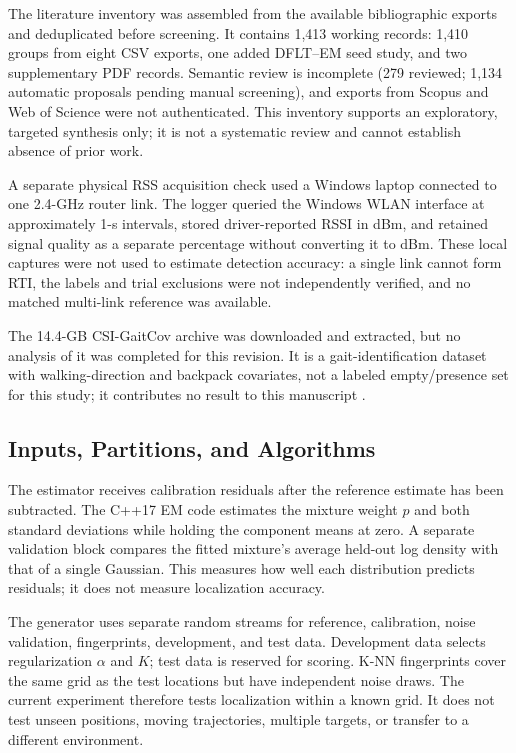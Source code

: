 \documentclass[sensors,article,submit,oneauthor]{Definitions/mdpi}
\begin{document}
The literature inventory was assembled from the available bibliographic exports and deduplicated before screening. It contains 1,413 working records: 1,410 groups from eight CSV exports, one added DFLT--EM seed study, and two supplementary PDF records. Semantic review is incomplete (279 reviewed; 1,134 automatic proposals pending manual screening), and exports from Scopus and Web of Science were not authenticated. This inventory supports an exploratory, targeted synthesis only; it is not a systematic review and cannot establish absence of prior work.

A separate physical RSS acquisition check used a Windows laptop connected to one 2.4-GHz router link. The logger queried the Windows WLAN interface at approximately 1-s intervals, stored driver-reported RSSI in dBm, and retained signal quality as a separate percentage without converting it to dBm. These local captures were not used to estimate detection accuracy: a single link cannot form RTI, the labels and trial exclusions were not independently verified, and no matched multi-link reference was available.

The 14.4-GB CSI-GaitCov archive was downloaded and extracted, but no analysis of it was completed for this revision. It is a gait-identification dataset with walking-direction and backpack covariates, not a labeled empty/presence set for this study; it contributes no result to this manuscript \cite{GaitCov2026}.
\subsection{Inputs, Partitions, and Algorithms}

The estimator receives calibration residuals after the reference estimate has been subtracted. The C++17 EM code estimates the mixture weight $p$ and both standard deviations while holding the component means at zero. A separate validation block compares the fitted mixture's average held-out log density with that of a single Gaussian. This measures how well each distribution predicts residuals; it does not measure localization accuracy.

The generator uses separate random streams for reference, calibration, noise validation, fingerprints, development, and test data. Development data selects regularization $\alpha$ and $K$; test data is reserved for scoring. K-NN fingerprints cover the same grid as the test locations but have independent noise draws. The current experiment therefore tests localization within a known grid. It does not test unseen positions, moving trajectories, multiple targets, or transfer to a different environment.
\end{document}
